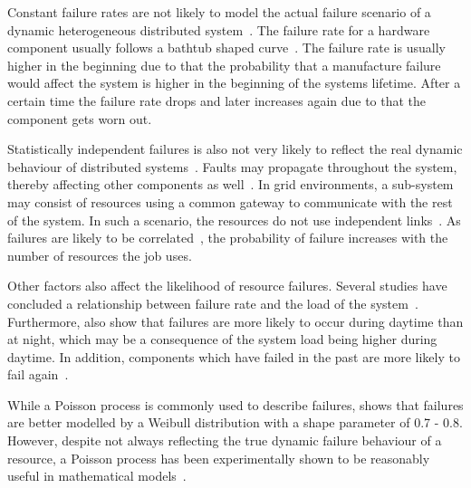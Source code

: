 \documentclass{cslthse-msc}
\begin{document}

Constant failure rates are not likely to model the actual failure scenario of a dynamic heterogeneous distributed system~\cite{algoMinExTime}. The failure rate for a hardware component usually follows a bathtub shaped curve~\cite{surveyReliabilityDistr}. The failure rate is usually higher in the beginning due to that the probability that a manufacture failure would affect the system is higher in the beginning of the systems lifetime. After a certain time the failure rate drops and later increases again due to that the component gets worn out. %

Statistically independent failures is also not very likely to reflect the real dynamic behaviour of distributed systems~\cite{surveyReliabilityDistr, cloudServiceRel}. Faults may propagate throughout the system, thereby affecting other components as well~\cite{relGridSystems}. In grid environments, a sub-system may consist of resources using a common gateway to communicate with the rest of the system. In such a scenario, the resources do not use independent links~\cite{optResourceAllMaxPerformance}. As failures are likely to be correlated~\cite{perfImplPerCheckPoint}, the probability of failure increases with the number of resources the job uses.

Other factors also affect the likelihood of resource failures. Several studies have concluded a relationship between failure rate and the load of the system~\cite{studyOfFailures, implicationsOfFailures}. Furthermore, \cite{studyOfFailures, implicationsOfFailures} also show that failures are more likely to occur during daytime than at night, which may be a consequence of the system load being higher during daytime. In addition, components which have failed in the past are more likely to fail again~\cite{implicationsOfFailures}.

While a Poisson process is commonly used to describe failures, \cite{studyOfFailures} shows that failures are better modelled by a Weibull distribution with a shape parameter of 0.7 - 0.8. However, despite not always reflecting the true dynamic failure behaviour of a resource, a Poisson process has been experimentally shown to be reasonably useful in mathematical models~\cite{experimentalFailureAssessment}.
\end{document}
